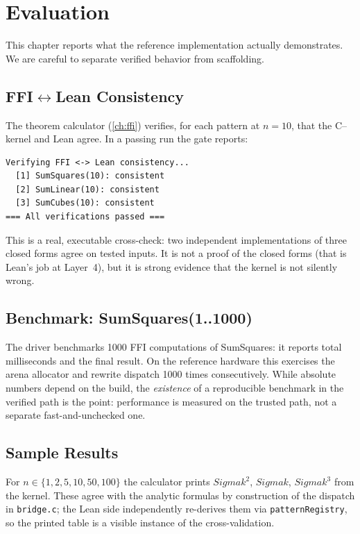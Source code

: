 \chapter{Evaluation}
\label{ch:eval}

This chapter reports what the reference implementation actually demonstrates.
We are careful to separate verified behavior from scaffolding.

\section{FFI$\leftrightarrow$Lean Consistency}
\label{sec:eval-consistency}

The theorem calculator (\cref{ch:ffi}) verifies, for each pattern at $n=10$,
that the C{--} kernel and Lean agree. In a passing run the gate reports:
\begin{verbatim}
Verifying FFI <-> Lean consistency...
  [1] SumSquares(10): consistent
  [2] SumLinear(10): consistent
  [3] SumCubes(10): consistent
=== All verifications passed ===
\end{verbatim}
This is a real, executable cross-check: two independent implementations of
three closed forms agree on tested inputs. It is not a proof of the closed
forms (that is Lean's job at Layer~4), but it is strong evidence that the
kernel is not silently wrong.

\section{Benchmark: SumSquares(1..1000)}
\label{sec:eval-bench}

The driver benchmarks 1000 FFI computations of SumSquares: it reports total
milliseconds and the final result. On the reference hardware this exercises
the arena allocator and rewrite dispatch 1000 times consecutively. While
absolute numbers depend on the build, the \emph{existence} of a reproducible
benchmark in the verified path is the point: performance is measured on the
trusted path, not a separate fast-and-unchecked one.

\section{Sample Results}
\label{sec:eval-samples}

For $n \in \{1,2,5,10,50,100\}$ the calculator prints
$\ensuremath{Sigma} k^2$, $\ensuremath{Sigma} k$, $\ensuremath{Sigma} k^3$ from the kernel. These agree with the
analytic formulas by construction of the dispatch in \texttt{bridge.c}; the
Lean side independently re-derives them via \texttt{patternRegistry}, so the
printed table is a visible instance of the cross-validation.

